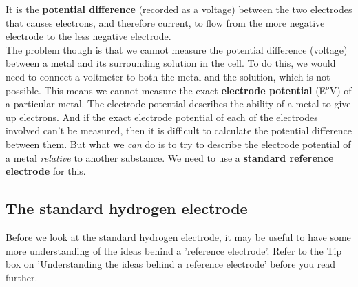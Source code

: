 It is the \textbf{potential difference} (recorded as a voltage) between the two electrodes that causes electrons, and therefore current, to flow from the more negative electrode to the less negative electrode.\\

The problem though is that we cannot measure the potential difference (voltage) between a metal and its surrounding solution in the cell. To do this, we would need to connect a voltmeter to both the metal and the solution, which is not possible. This means we cannot measure the exact \textbf{electrode potential} (E$^{o}$V) of a particular metal. The electrode potential describes the ability of a metal to give up electrons. And if the exact electrode potential of each of the electrodes involved can't be measured, then it is difficult to calculate the potential difference between them. But what we \textit{can} do is to try to describe the electrode potential of a metal \textit{relative} to another substance. We need to use a \textbf{standard reference electrode} for this.

\subsection{The standard hydrogen electrode}
\label{subsec:electrochemical:hydrogen electrode}

Before we look at the standard hydrogen electrode, it may be useful to have some more understanding of the ideas behind a 'reference electrode'. Refer to the Tip box on 'Understanding the ideas behind a reference electrode' before you read further.

